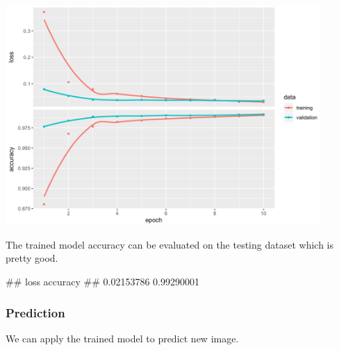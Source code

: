 \documentclass[12pt,]{krantz}
\makeatletter
\newenvironment{Shaded}{\begin{snugshade}}{\end{snugshade}}
\newcommand{\CommentTok}[1]{\textcolor[rgb]{0.37,0.37,0.37}{\textit{#1}}}
\newcommand{\KeywordTok}[1]{\textcolor[rgb]{0.27,0.27,0.27}{\textbf{#1}}}
\newcommand{\NormalTok}[1]{#1}
\newcommand{\OperatorTok}[1]{\textcolor[rgb]{0.43,0.43,0.43}{\textbf{#1}}}
\newcommand{\StringTok}[1]{\textcolor[rgb]{0.5,0.5,0.5}{#1}}
\newenvironment{kframe}{%
\medskip{}
\setlength{\fboxsep}{.8em}
 \def\at@end@of@kframe{}%
 \ifinner\ifhmode%
  \def\at@end@of@kframe{\end{minipage}}%
  \begin{minipage}{\columnwidth}%
 \fi\fi%
 \def\FrameCommand##1{\hskip\@totalleftmargin \hskip-\fboxsep
 \colorbox{shadecolor}{##1}\hskip-\fboxsep
     \hskip-\linewidth \hskip-\@totalleftmargin \hskip\columnwidth}%
 \MakeFramed {\advance\hsize-\width
   \@totalleftmargin\z@ \linewidth\hsize
   \@setminipage}}%
 {\par\unskip\endMakeFramed%
 \at@end@of@kframe}
\renewenvironment{Shaded}{\begin{kframe}}{\end{kframe}}
\makeatother
\begin{document}
\includegraphics[width=0.9\textwidth,height=\textheight]{images/cnn_history.png}

The trained model accuracy can be evaluated on the testing dataset which is pretty good.

\begin{Shaded}
\end{Shaded}

\begin{Shaded}
\begin{Highlighting}[]
\NormalTok{##       loss   accuracy }
\NormalTok{## 0.02153786 0.99290001}
\end{Highlighting}
\end{Shaded}

\hypertarget{prediction-1}{%
\subsubsection{Prediction}\label{prediction-1}}

We can apply the trained model to predict new image.

\begin{Shaded}
\end{Shaded}
\end{document}
